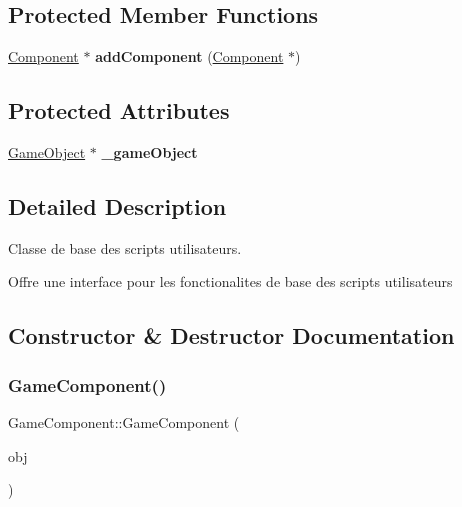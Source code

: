 \subsection*{Protected Member Functions}
\begin{DoxyCompactItemize}
\item 
\hypertarget{class_game_component_abeecc14e2cd29b7ec83d74aabfe4403b}{}\label{class_game_component_abeecc14e2cd29b7ec83d74aabfe4403b} 
\hyperlink{class_component}{Component} $\ast$ {\bfseries add\+Component} (\hyperlink{class_component}{Component} $\ast$)
\end{DoxyCompactItemize}
\subsection*{Protected Attributes}
\begin{DoxyCompactItemize}
\item 
\hypertarget{class_game_component_af36779887688a4f6db73e3d594c0e516}{}\label{class_game_component_af36779887688a4f6db73e3d594c0e516} 
\hyperlink{class_game_object}{Game\+Object} $\ast$ {\bfseries \+\_\+game\+Object}
\end{DoxyCompactItemize}


\subsection{Detailed Description}
Classe de base des scripts utilisateurs. 

Offre une interface pour les fonctionalites de base des scripts utilisateurs 

\subsection{Constructor \& Destructor Documentation}
\hypertarget{class_game_component_a2323370728584eb85a822086605e0a09}{}\label{class_game_component_a2323370728584eb85a822086605e0a09} 
\subsubsection{\texorpdfstring{Game\+Component()}{GameComponent()}}
{\footnotesize\ttfamily Game\+Component\+::\+Game\+Component (\begin{DoxyParamCaption}\item[{\hyperlink{class_game_object}{Game\+Object} $\ast$}]{obj }\end{DoxyParamCaption})}




